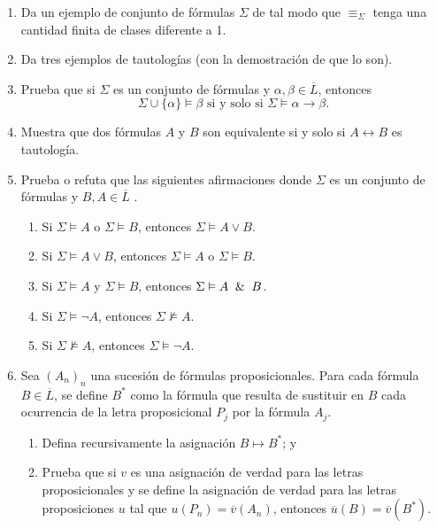 \documentclass[letterpaper,DIV=15,headsepline,12pt]{scrartcl}
\begin{document}
\begin{enumerate}
            \item Da un ejemplo de conjunto de fórmulas $\Sigma$ de tal modo que $\equiv_\Sigma$ tenga una cantidad finita de clases diferente a 1.
            \item Da tres ejemplos de tautologías (con la demostración de que lo son).
            \item Prueba que si $\Sigma$ es un conjunto de fórmulas y $\alpha ,\beta\in \overline{L}$, entonces
                \begin{displaymath}
                    \Sigma\cup\{\alpha\}\vDash\beta\text{ si y solo si }\Sigma\vDash \alpha\longrightarrow\beta\text{.}
                \end{displaymath}
            \item Muestra que dos fórmulas $A$ y $B$ son equivalente si y solo si $A\longleftrightarrow B$ es tautología.
            \item Prueba o refuta que las siguientes afirmaciones donde $\Sigma$ es un conjunto de fórmulas y $B ,A\in \overline{L}$ .
                \begin{enumerate}
                    \item Si $\Sigma\vDash A$ o $\Sigma\vDash B$, entonces $\Sigma\vDash A\vee B$.
                    \item Si  $\Sigma\vDash A\vee B$, entonces $\Sigma\vDash A$ o $\Sigma\vDash B$.
                    \item Si $\Sigma\vDash A$ y $\Sigma\vDash B$, entonces $\Sigma\vDash A\And B$.
                    \item Si $\Sigma\vDash \neg A$, entonces $\Sigma\nvDash A$.
                    \item Si $\Sigma\nvDash A$, entonces $\Sigma\vDash\neg A$.
                \end{enumerate}
            \item Sea $(A_n)_n$ una sucesión de fórmulas proposicionales. Para cada fórmula $B\in\overline{L}$, se define $B^*$ como la fórmula que resulta de sustituir en $B$ cada ocurrencia de la letra proposicional $P_j$ por la fórmula $A_j$.
                \begin{enumerate}
                    \item Defina recursivamente la asignación $B\mapsto B^*$; y
                    \item Prueba que si $v$ es una asignación de verdad para las letras proposicionales y se define la asignación de verdad para las letras proposiciones $u$ tal que $u(P_n)=\overline{v} (A_n)$, entonces $\overline{u} (B)=\overline{v}(B^*)$.

\end{enumerate}
\end{enumerate}
\end{document}
